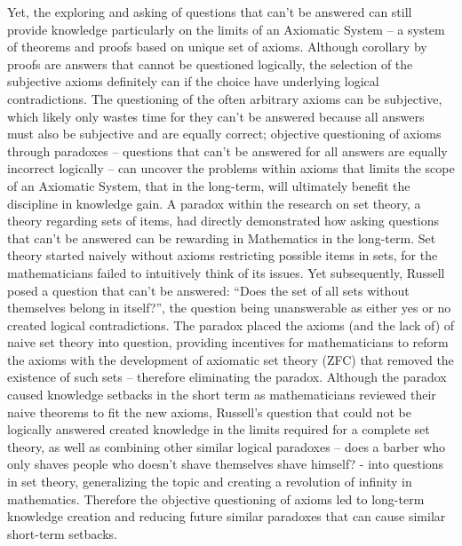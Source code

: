 \documentclass[a4paper,12pt]{article}
\begin{document}
Yet, the exploring and asking of questions that can’t be answered can still provide knowledge particularly on the limits of an Axiomatic System – a system of theorems and proofs based on unique set of axioms. Although corollary by proofs are answers that cannot be questioned logically, the selection of the subjective axioms definitely can if the choice have underlying logical contradictions. The questioning of the often arbitrary axioms can be subjective, which likely only wastes time for they can’t be answered because all answers must also be subjective and are equally correct; objective questioning of axioms through paradoxes – questions that can’t be answered for all answers are equally incorrect logically – can uncover the problems within axioms that limits the scope of an Axiomatic System, that in the long-term, will ultimately benefit the discipline in knowledge gain. A paradox within the research on set theory, a theory regarding sets of items, had directly demonstrated how asking questions that can’t be answered can be rewarding in Mathematics in the long-term. Set theory started naively without axioms restricting possible items in  sets, for the mathematicians failed to intuitively think of its issues. Yet subsequently, Russell posed a question that can’t be answered: “Does the set of all sets without themselves belong in itself?”, the question being unanswerable as either yes or no created logical contradictions. The paradox placed the axioms (and the lack of) of naive set theory into question, providing incentives for mathematicians to reform the axioms with the development of axiomatic set theory (ZFC) that removed the existence of such sets – therefore eliminating the paradox. Although the paradox caused knowledge setbacks in the short term as mathematicians reviewed their naive theorems to fit the new axioms, Russell’s question that could not be logically answered created knowledge in the limits required for a complete set theory, as well as combining other similar logical paradoxes – does a barber who only shaves people who doesn’t shave themselves shave himself? - into questions in set theory, generalizing the topic and creating a revolution of infinity in mathematics. Therefore the objective questioning of axioms led to long-term knowledge creation and reducing future similar paradoxes that can cause similar short-term setbacks.
\end{document}
